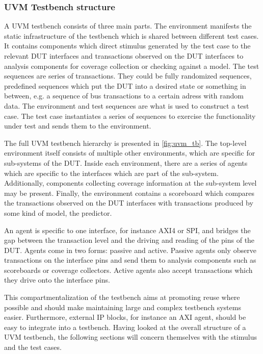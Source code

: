 \documentclass[12pt]{report}
\begin{document}
\subsubsection{UVM Testbench structure} %

A UVM testbench consists of three main parts. The environment manifests the static infrastructure of the testbench
which is shared between different test cases. It contains components which direct stimulus generated by the test case
to the relevant DUT interfaces and transactions observed on the DUT interfaces to analysis components for coverage
collection or checking against a model. The test sequences are series of transactions. They could be fully randomized
sequences, predefined sequences which put the DUT into a desired state or something in between, e.g. a sequence of
bus transactions to a certain adress with random data. The environment and test sequences are what is used to
construct a test case. The test case instantiates a series of sequences to exercise the functionality under test and
sends them to the environment.

The full UVM testbench hierarchy is presented in \ref{fig:uvm_tb}. The top-level environment itself consists of
multiple other environments, which are specific for sub-systems of the DUT. Inside each environment, there are a
series of agents which are specific to the interfaces which are part of the sub-system. Additionally, components
collecting coverage information at the sub-system level may be present. Finally, the environment contains a
scoreboard which compares the transactions observed on the DUT interfaces with transactions produced by some kind of
model, the predictor.

An agent is specific to one interface, for instance AXI4 or SPI, and bridges the gap between the transaction level
and the driving and reading of the pins of the DUT. Agents come in two forms: passive and active. Passive agents only
observe transactions on the interface pins and send them to analysis components such as scoreboards or coverage
collectors. Active agents also accept transactions which they drive onto the interface pins.

This compartmentalization of the testbench aims at promoting reuse where possible and should make maintaining large
and complex testbench systems easier. Furthermore, external IP blocks, for instance an AXI agent, should be easy to
integrate into a testbench. Having looked at the overall structure of a UVM testbench, the following sections will
concern themselves with the stimulus and the test cases.
\end{document}

